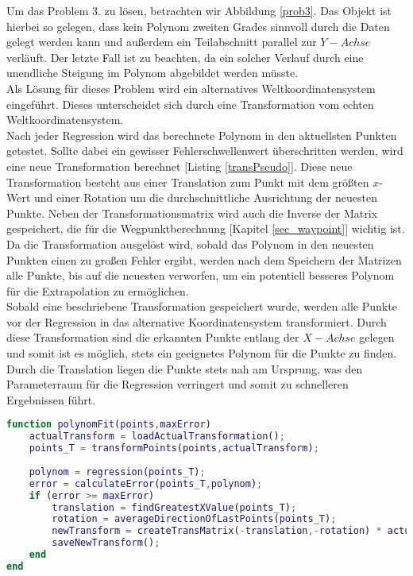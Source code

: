 Um das Problem 3. zu lösen, betrachten wir Abbildung \ref{prob3}. Das Objekt ist hierbei so gelegen, dass kein Polynom zweiten Grades sinnvoll durch die Daten gelegt werden kann und außerdem ein Teilabschnitt parallel zur $Y-Achse$ verläuft. Der letzte Fall ist zu beachten, da ein solcher Verlauf durch eine unendliche Steigung im Polynom abgebildet werden müsste.\\
Als Lösung für dieses Problem wird ein alternatives Weltkoordinatensystem eingeführt. Dieses unterscheidet sich durch eine Transformation vom echten Weltkoordinatensystem.\\
Nach jeder Regression wird das berechnete Polynom in den aktuellsten Punkten getestet. Sollte dabei ein gewisser Fehlerschwellenwert überschritten werden, wird eine neue Transformation berechnet [Listing \ref{transPseudo}]. Diese neue Transformation besteht aus einer Translation zum Punkt mit dem größten $x$-Wert und einer Rotation um die durchschnittliche Ausrichtung der neuesten Punkte. Neben der Transformationsmatrix wird auch die Inverse der Matrix gespeichert, die für die Wegpunktberechnung [Kapitel \ref{sec_waypoint}] wichtig ist. Da die Transformation ausgelöst wird, sobald das Polynom in den neuesten Punkten einen zu großen Fehler ergibt, werden nach dem Speichern der Matrizen alle Punkte, bis auf die neuesten verworfen, um ein potentiell besseres Polynom für die Extrapolation zu ermöglichen.\\
Sobald eine beschriebene Transformation gespeichert wurde, werden alle Punkte vor der Regression in das alternative Koordinatensystem transformiert. Durch diese Transformation sind die erkannten Punkte entlang der $X-Achse$ gelegen und somit ist es möglich, stets ein geeignetes Polynom für die Punkte zu finden. Durch die Translation liegen die Punkte stets nah am Ursprung, was den Parameterraum für die Regression verringert und somit zu schnelleren Ergebnissen führt.\label{alterWorldCoords}
\begin{lstlisting}[language=Matlab,caption=Pseudocode des Schätzverfahrens,label=transPseudo]
function polynomFit(points,maxError)
	actualTransform = loadActualTransformation();
	points_T = transformPoints(points,actualTransform);
	
	polynom = regression(points_T);
	error = calculateError(points_T,polynom);
	if (error >= maxError)
		translation = findGreatestXValue(points_T);
		rotation = averageDirectionOfLastPoints(points_T);
		newTransform = createTransMatrix(-translation,-rotation) * actualTransform;
		saveNewTransform();
	end
end
\end{lstlisting}



